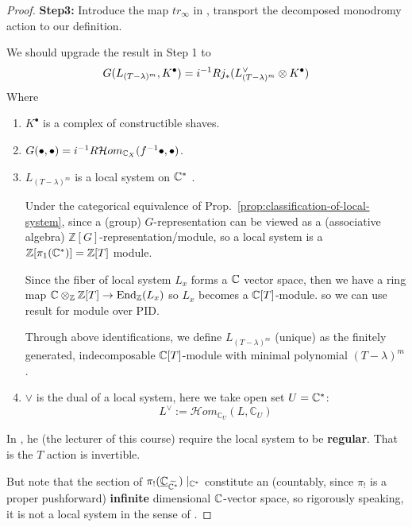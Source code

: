 \begin{proof}
    \medskip

    \noindent\textbf{Step3: }Introduce the map $tr_\infty$ in \cite[Thm.~3.10]{Wu2017NearbyVanishingCycles}, transport the decomposed monodromy action to our definition.

    We should upgrade the result in Step 1 to
    \[
        G(L_{(T-\lambda)^m}, {K^\bullet})=i^{-1}Rj_*(L^\vee_{(T-\lambda)^m}\otimes {K^\bullet})
    \]
    Where
    \begin{enumerate}
        \item $K^\bullet$ is a complex of constructible shaves.
        \item $G(\bullet,\bullet)=i^{-1}R\mathcal{H}om_{\mathbb{C}_{{X}}}(f^{-1}\bullet,\bullet)$.
        \item $L_{(T-\lambda)^m}$ is a local system on $\mathbb{C}^*$ \cite[\S~3.2.1]{Wu2017NearbyVanishingCycles}.

              Under the categorical equivalence of Prop.~\ref{prop:classification-of-local-system},
              since a (group) $G$-representation can be viewed as a (associative algebra) $\mathbb{Z}[G]$-representation/module,
              so a local system is a $\mathbb{Z}[\pi_1(\mathbb{C}^*)]=\mathbb{Z}[T]$ module.

              Since the fiber of local system $L_x$ forms a $\mathbb{C}$ vector space,
              then we have a ring map $\mathbb{C}\otimes_\mathbb{Z} \mathbb{Z}[T] \to \operatorname{End}_{\mathbb{Z}}(L_x)$ so $L_x$ becomes a $\mathbb{C}[T]$-module.
              so we can use result for module over PID.

              Through above identifications, we define $L_{(T-\lambda)^m}$ (unique) as the finitely generated, indecomposable $\mathbb{C}[T]$-module with minimal polynomial $(T-\lambda)^m$.
        \item $\vee$ is the dual of a local system, here we take open set $U=\mathbb{C}^*$:
              \[
                  L^\vee:=\mathcal Hom_{\mathbb C_U}(L,\mathbb C_U)
              \]
    \end{enumerate}

    In \cite[\S~3.2.1]{Wu2017NearbyVanishingCycles}, he (the lecturer of this course) require the local system to be \textbf{regular}.
    That is the $T$ action is invertible.

    But note that the section of $\pi_!(\underline{\mathbb{C}}_{\widetilde{\mathbb{C}^*}})\mid_{\mathbb{C}^*}$ constitute an
    (countably, since $\pi_!$ is a proper pushforward) \textbf{infinite} dimensional $\mathbb{C}$-vector space, so rigorously speaking,
    it is not a local system in the sense of \cite[Definition~1.1]{DeligneLNM163}.


\end{proof}
